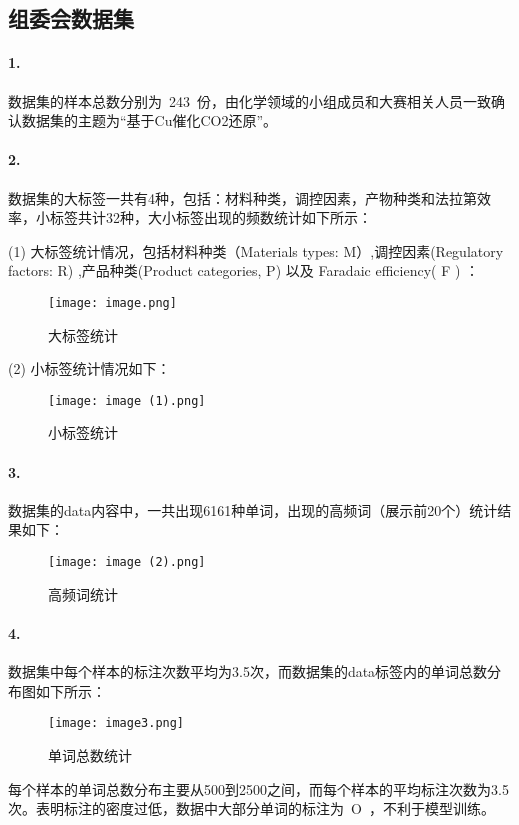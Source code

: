 \documentclass{article}
\begin{document}
\subsection{组委会数据集}
\paragraph{1.}数据集的样本总数分别为 243 份，由化学领域的小组成员和大赛相关人员一致确认数据集的主题为“基于Cu催化CO2​还原”。
\paragraph{2.}数据集的大标签一共有4种，包括：材料种类，调控因素，产物种类和法拉第效率，小标签共计32种，大小标签出现的频数统计如下所示：

(1) 大标签统计情况，包括材料种类（Materials types: M）,调控因素(Regulatory factors: R) ,产品种类(Product categories, P) 以及 Faradaic efficiency( F ) ：
\begin{figure}[H]
	\centering
    \texttt{[image: image.png]}
    \caption{大标签统计}
    \label{fig:labels}
\end{figure}

(2) 小标签统计情况如下：

\begin{figure}[H]
	\centering
    \texttt{[image: image (1).png]}
    \caption{小标签统计}
    \label{fig:small_labels}
\end{figure}

\paragraph{3.}数据集的data内容中，一共出现6161种单词，出现的高频词（展示前20个）统计结果如下：
\begin{figure}[H]
	\centering
    \texttt{[image: image (2).png]}
    \caption{高频词统计}
    \label{fig:vocab}
\end{figure}

\paragraph{4.}数据集中每个样本的标注次数平均为3.5次，而数据集的data标签内的单词总数分布图如下所示：

\begin{figure}[H]
	\centering
    \texttt{[image: image3.png]}
    \caption{单词总数统计}
    \label{fig:count_voacb}
\end{figure}
每个样本的单词总数分布主要从500到2500之间，而每个样本的平均标注次数为3.5次。表明标注的密度过低，数据中大部分单词的标注为 O ，不利于模型训练。
\end{document}
